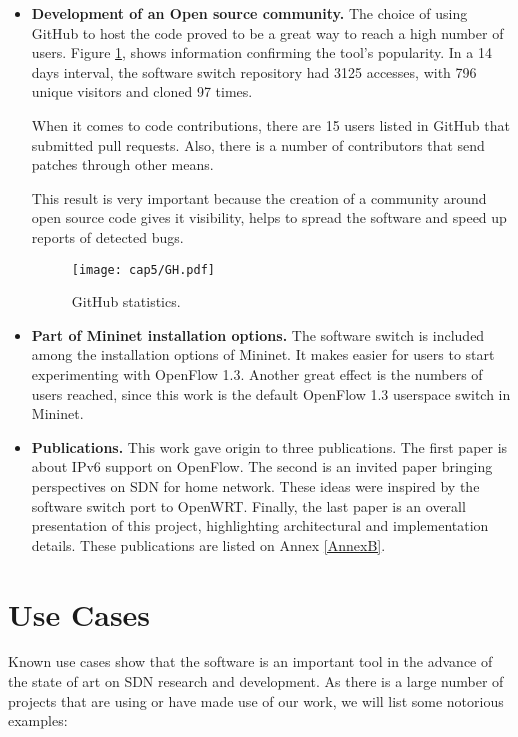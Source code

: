\begin{itemize}
\item \textbf{Development of an Open source community.} The choice of using GitHub to host the code proved to be a great way to reach a high number of users. Figure \ref{fig:ghstats}, shows information confirming the tool's popularity. In a 14 days interval, the software switch repository had 3125 accesses, with 796 unique visitors and cloned 97 times. 

When it comes to code contributions, there are 15 users listed in GitHub that submitted pull requests. Also, there is a number of contributors that send patches through other means.

This result is very important because the creation of a community around open source code gives it visibility, helps to spread the software and speed up reports of detected bugs. 

\begin{figure}[H]
\centering
\texttt{[image: cap5/GH.pdf]}
\caption{GitHub statistics.}
\label{fig:ghstats}
\end{figure}

\item \textbf{Part of Mininet installation options.} The software switch is included among the installation options of Mininet. It makes easier for users to start experimenting with OpenFlow 1.3. Another great effect is the numbers of users reached, since this work is the default OpenFlow 1.3 userspace switch in Mininet.      

\item \textbf{Publications.} This work gave origin to three publications. The first paper is about IPv6 support on OpenFlow. The second is an invited paper bringing perspectives on SDN for home network. These ideas were inspired by the software switch port to OpenWRT. Finally, the last paper is an overall presentation of this project, highlighting architectural and implementation details. These publications are listed on Annex \ref{AnnexB}.  
\end{itemize}


\section{Use Cases}
\label{sec:cases}

Known use cases show that the software is an important tool in the advance of the state of art on SDN research and development. As there is a large number of projects that are using or have made use of our work, we will list some notorious examples: 

